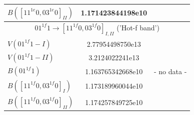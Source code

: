 \documentclass{report}
\begin{document}
\begin{appendices}
\begin{table}
\begin{tabular}{|l|cccccc|}
$B([11^{1e}0,03^{1e}0]_{II})$ & 1.171423844198e10 &  &  &  &  &\\
\hline
\multicolumn{7}{|c|}{$01^{1f}1\rightarrow[11^{1f}0,03^{1f}0]_{I,II}$ ('Hot-f band')}\\
\hline
$V(01^{1f}1-I)$               & 2.77954498750e13  &  &  &  &  &\\
$V(01^{1f}1-II)$              & 3.2124022241e13   &  &  &  &  &\\
$B(01^{1f}1)$                 & 1.163765342668e10 & \multicolumn{5}{c|}{- no data -}\\
$B([11^{1f}0,03^{1f}0]_I)$    & 1.173189960044e10 &  &  &  &  &\\
$B([11^{1f}0,03^{1f}0]_{II})$ & 1.174257849725e10 &  &  &  &  &\\
\hline
\end{tabular}
\end{table}


\end{appendices}
\end{document}
